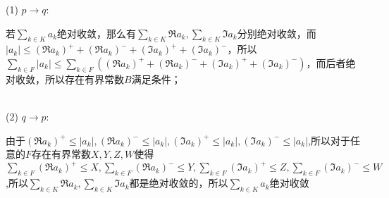 \documentclass[onecolumn]{article}
\begin{document}
(1) $p\rightarrow q$:\par 
若$\sum_{k \in K}a_{k}$绝对收敛，那么有$\sum_{k\in K}\Re a_{k},\sum_{k\in K}\Im  a_{k}$分别绝对收敛，而$|a_{k}|\leq (\Re a_{k})^{+}+(\Re a_{k})^{-}+(\Im  a_{k})^{+}+(\Im  a_{k})^{-}$，所以$\sum_{k\in F}|a_{k}|\leq \sum_{k\in F}((\Re a_{k})^{+}+(\Re a_{k})^{-}+(\Im  a_{k})^{+}+(\Im  a_{k})^{-})$，而后者绝对收敛，所以存在有界常数$B$满足条件；\par
~\\
(2) $q\rightarrow p$:\par
由于$(\Re a_{k})^{+}\leq |a_{k}|,(\Re a_{k})^{-}\leq |a_{k}|,(\Im  a_{k})^{+}\leq |a_{k}|,(\Im  a_{k})^{-}\leq |a_{k}|$,所以对于任意的$F$存在有界常数$X,Y,Z,W$使得$\sum_{k\in F}(\Re a_{k})^{+}\leq X,\sum_{k\in F}(\Re a_{k})^{-}\leq Y,\sum_{k\in F}(\Im  a_{k})^{+}\leq Z,\sum_{k\in F}(\Im  a_{k})^{-}\leq W$,所以$\sum_{k\in K}\Re a_{k},\sum_{k\in K}\Im a_{k}$都是绝对收敛的，所以$\sum_{k \in K}a_{k}$绝对收敛 \par
~\\
\end{document}

